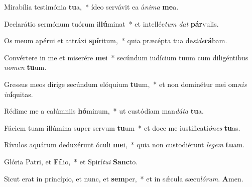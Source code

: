 \item Mirabília testimónia \textbf{tu}a,~* ídeo servávit ea á\textit{nima} \textbf{me}a.

\item Declarátio sermónum tuórum il\textbf{lú}minat~* et intelléc\textit{tum} \textit{dat} \textbf{pár}vulis.

\item Os meum apérui et attráxi \textbf{spí}ritum,~* quia præcépta tua de\textit{side}\textbf{rá}bam.

\item Convértere in me et miserére \textbf{me}i~* secúndum iudícium tuum cum diligéntibus \textit{nomen} \textbf{tu}um.

\item Gressus meos dírige secúndum elóquium \textbf{tu}um,~* et non dominétur mei om\textit{nis} \textit{in}\textbf{í}quitas.

\item Rédime me a calúmniis \textbf{hó}minum,~* ut custódiam man\textit{dáta} \textbf{tu}a.

\item Fáciem tuam illúmina super servum \textbf{tu}um~* et doce me iustificati\textit{ónes} \textbf{tu}as.

\item Rívulos aquárum deduxérunt óculi \textbf{me}i,~* quia non custodiérunt \textit{legem} \textbf{tu}am.

\item Glória Patri, et \textbf{Fí}lio,~* et Spirí\textit{tui} \textbf{Sanc}to.

\item Sicut erat in princípio, et nunc, et \textbf{sem}per,~* et in sǽcula sæcu\textit{lórum}. \textbf{A}men.